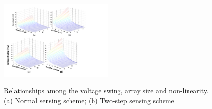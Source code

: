%

\begin{figure}[!b]
\centering
  \includegraphics[width=0.5\textwidth]{./figures/sense_margin2}\\
  \caption{Relationships among the voltage swing, array size and non-linearity. (a) Normal sensing scheme; (b) Two-step sensing scheme}\label{fig:sense_margin}
\end{figure}
